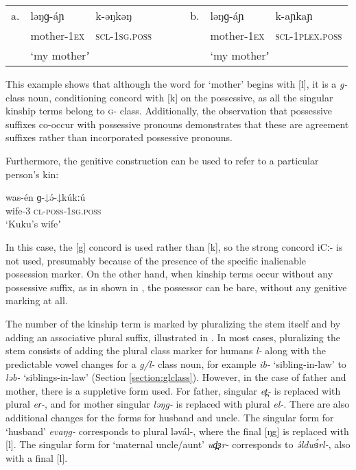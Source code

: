 \ea 
\hspace{-12pt} \vspace{-12pt} \begin{tabular}[t]{lllllll}
 a. &  ləŋɡ-áɲ & k-əŋkəŋ	& {\ \ \ } & b.	&	ləŋɡ-áɲ &  k-aɲkaɲ\\
 & mother-\textsc{1ex} & \textsc{scl-1sg.poss}  & & &	mother-\textsc{1ex} & \textsc{scl-1plex.poss} \\
& \multicolumn{2}{l}{‘my motherʼ} & &  & \multicolumn{2}{l}{‘my motherʼ}	\\	
\end{tabular}
\z
This example shows that although the word for `mother’ begins with [l], it is a \textit{g-} class noun, conditioning concord with [k] on the possessive, as all the singular kinship terms belong to \textsc{g-} class. Additionally, the observation that possessive suffixes co-occur with possessive pronouns demonstrates that these are agreement suffixes rather than incorporated possessive pronouns.

Furthermore, the genitive construction can be used to refer to a particular person’s kin:

\ea \gll was-én ɡ-↓ə́-↓kúkːú \\
wife-3 \textsc{cl-}\textsc{poss-}1\textsc{sg}.\textsc{poss} \\
\glt ‘Kuku's wifeʼ
\z 

In this case, the [g] concord is used rather than [k], so the strong concord iCː- is not used, presumably because of the presence of the specific inalienable possession marker. On the other hand, when kinship terms occur without any possessive suffix, as in shown in , the possessor can be bare, without any genitive marking at all.

The number of the kinship term is marked by pluralizing the stem itself and by adding an associative plural suffix, illustrated in . In most cases, pluralizing the stem consists of adding the plural class marker for humans \textit{l-} along with the predictable vowel changes for a \textit{g/l-} class noun, for example \textit{ib-} `sibling-in-law' to \textit{ləb-} `siblings-in-law' (Section \ref{section:glclass}). However, in the case of father and mother, there is a suppletive form used. For father, singular \textit{et̪-} is replaced with plural \textit{eɾ-}, and for mother singular \textit{ləŋg-} is replaced with plural \textit{el-}. There are also additional changes for the forms for husband and uncle. The singular form for `husband’ \textit{evaŋg-} corresponds to plural ləvál-, where the final [ŋg] is replaced with [l]. The singular form for `maternal uncle/aunt’ \textit{ud̪ɜr-} corresponds to \textit{ə́ldwɜ́rl-}, also with a final [l]. 
	
